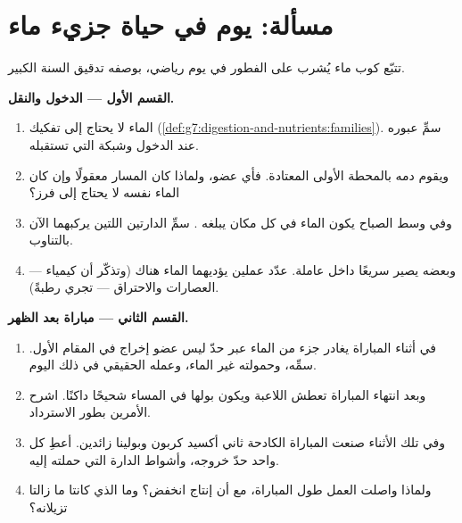 \section{مسألة: يوم في حياة جزيء ماء}

\begin{problem}\label{pb:g7:removing-wastes:1}
تتبّع كوب ماء يُشرب على الفطور في يوم رياضي، بوصفه تدقيق السنة
الكبير.

\medskip\noindent\textbf{القسم الأول --- الدخول والنقل.}
\begin{enumerate}
  \item الماء لا يحتاج إلى تفكيك
        (\cref{def:g7:digestion-and-nutrients:families}).
        سمِّ عبوره عند الدخول وشبكة  التي تستقبله.
  \item ويقوم دمه بالمحطة الأولى المعتادة. فأي عضو، ولماذا كان
        المسار معقولًا  وإن كان الماء نفسه لا يحتاج إلى
        فرز؟
  \item وفي وسط الصباح يكون الماء في كل مكان يبلغه . سمِّ
        الدارتين اللتين يركبهما الآن بالتناوب.
  \item وبعضه يصير سريعًا داخل  عاملة. عدّد عملين يؤديهما
        الماء هناك (وتذكّر أن كيمياء  --- العصارات
        والاحتراق --- تجري رطبةً).
\end{enumerate}

\medskip\noindent\textbf{القسم الثاني --- مباراة بعد
الظهر.}
\begin{enumerate}[resume]
  \item في أثناء المباراة يغادر جزء من الماء عبر حدّ ليس عضو
        إخراج في المقام الأول. سمِّه، وحمولته غير الماء، وعمله
        الحقيقي في ذلك اليوم.
  \item وبعد انتهاء المباراة تعطش اللاعبة ويكون بولها في المساء
        شحيحًا داكنًا. اشرح الأمرين بطور الاسترداد.
  \item وفي تلك الأثناء صنعت  المباراة الكادحة ثاني أكسيد
        كربون وبولينا زائدين. أعطِ كل واحد حدّ خروجه، وأشواط
        الدارة التي حملته إليه.
  \item ولماذا واصلت  العمل طول المباراة، مع أن إنتاج
         انخفض؟ وما الذي كانتا ما زالتا تزيلانه؟
\end{enumerate}


\end{problem}

